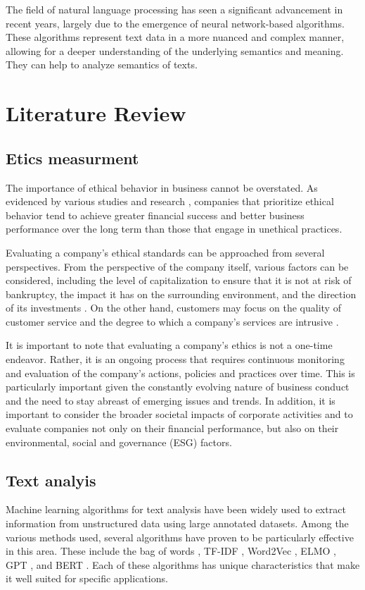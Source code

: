\documentclass[PI]{ProjectProposal}
\begin{document}
The field of natural language processing has seen a significant advancement in recent years, largely due to the emergence of neural network-based algorithms. These algorithms represent text data in a more nuanced and complex manner, allowing for a deeper understanding of the underlying semantics and meaning. They can help to analyze semantics of texts.
\chapter{Literature Review}
\label{sec:org0901004}
\section{Etics measurment}
\label{sec:orga1e0072}
The importance of ethical behavior in business cannot be overstated. As evidenced by various studies and research \autocites{climent_ethical_2018}[][]{mure_esg_2021}, companies that prioritize ethical behavior tend to achieve greater financial success and better business performance over the long term than those that engage in unethical practices.

Evaluating a company's ethical standards can be approached from several perspectives. From the perspective of the company itself, various factors can be considered, including the level of capitalization to ensure that it is not at risk of bankruptcy, the impact it has on the surrounding environment, and the direction of its investments \autocite{harvey1995ethical}. On the other hand, customers may focus on the quality of customer service \autocite{brunk2010exploring} and the degree to which a company's services are intrusive \autocite{mitchell1992bank}.

It is important to note that evaluating a company's ethics is not a one-time endeavor. Rather, it is an ongoing process that requires continuous monitoring and evaluation of the company's actions, policies and practices over time. This is particularly important given the constantly evolving nature of business conduct and the need to stay abreast of emerging issues and trends. In addition, it is important to consider the broader societal impacts of corporate activities and to evaluate companies not only on their financial performance, but also on their environmental, social and governance (ESG) factors.
\section{Text analyis}
\label{sec:org77876df}
Machine learning algorithms for text analysis have been widely used to extract information from unstructured data using large annotated datasets. Among the various methods used, several algorithms have proven to be particularly effective in this area. These include the bag of words \autocite{doi:10.1080/00437956.1954.11659520}, TF-IDF \autocite{jones1972statistical}, Word2Vec\autocite{mikolov2013distributed} , ELMO \autocite{elmo}, GPT \autocite{radford2019language}, and BERT \autocite{devlin2018bert}. Each of these algorithms has unique characteristics that make it well suited for specific applications.
\end{document}
